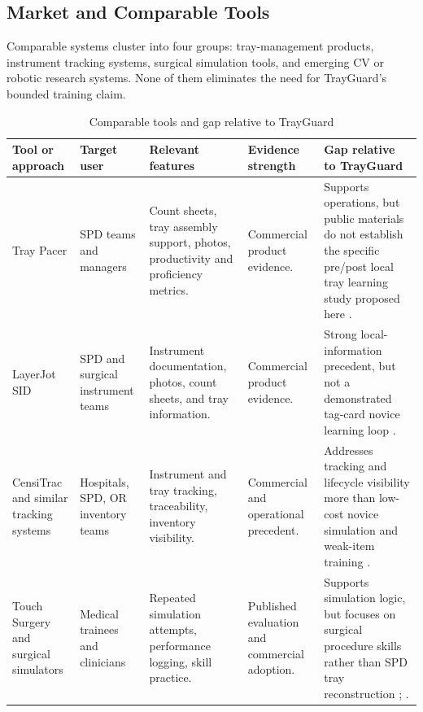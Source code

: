 \documentclass[10pt,a4paper]{article}
\begin{document}
\subsection{Market and Comparable Tools}


Comparable systems cluster into four groups: tray-management products,
instrument tracking systems, surgical simulation tools, and emerging CV or
robotic research systems. None of them eliminates the need for TrayGuard's
bounded training claim.
\begin{table}[H]
\centering
\caption{Comparable tools and gap relative to TrayGuard}
\label{tab:comparable-tools-and-gap-relative-to-trayguard}
\small\renewcommand{\arraystretch}{1.2}\setlength{\tabcolsep}{3pt}
\begin{tabularx}{\textwidth}{|>{\raggedright\arraybackslash}p{2.5cm}|>{\raggedright\arraybackslash}p{2.5cm}|>{\raggedright\arraybackslash}X|>{\raggedright\arraybackslash}p{2cm}|>{\raggedright\arraybackslash}X|}
\hline
Tool or approach & Target user & Relevant features & Evidence strength & Gap relative to TrayGuard \\
\hline
Tray Pacer & SPD teams and managers & Count sheets, tray assembly support, photos, productivity and proficiency metrics. & Commercial product evidence. & Supports operations, but public materials do not establish the specific pre/post local tray learning study proposed here \cite{tray-pacer-accessed-2026}. \\
\hline
LayerJot SID & SPD and surgical instrument teams & Instrument documentation, photos, count sheets, and tray information. & Commercial product evidence. & Strong local-information precedent, but not a demonstrated tag-card novice learning loop \cite{layerjot-sid-accessed-2026}. \\
\hline
CensiTrac and similar tracking systems & Hospitals, SPD, OR inventory teams & Instrument and tray tracking, traceability, inventory visibility. & Commercial and operational precedent. & Addresses tracking and lifecycle visibility more than low-cost novice simulation and weak-item training \cite{censitrac-accessed-2026}. \\
\hline
Touch Surgery and surgical simulators & Medical trainees and clinicians & Repeated simulation attempts, performance logging, skill practice. & Published evaluation and commercial adoption. & Supports simulation logic, but focuses on surgical procedure skills rather than SPD tray reconstruction \cite{tulipan-et-al-2019}; \cite{medtronic-touch-surgery-accessed-2026}. \\

\end{tabularx}
\end{table}
\end{document}
